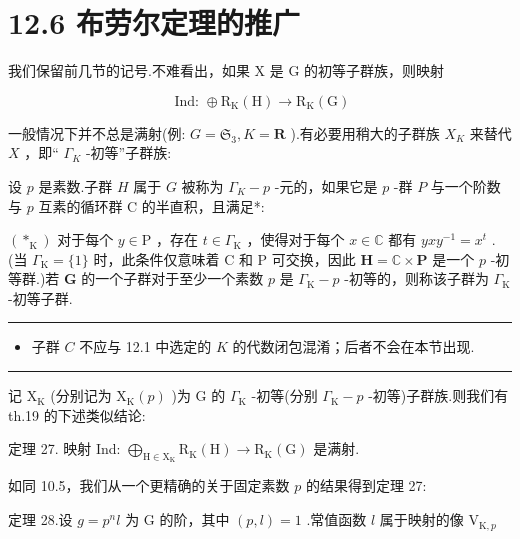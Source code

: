 \documentclass[10pt]{article}
\newcommand{\HRule}{\begin{center}\rule{0.9\linewidth}{0.2mm}\end{center}}
\begin{document}
\section*{12.6 布劳尔定理的推广}

我们保留前几节的记号.不难看出，如果 \(\mathrm{X}\) 是 \(\mathrm{G}\) 的初等子群族，则映射

\[
\text{ Ind: } \oplus  {\mathrm{R}}_{\mathrm{K}}\left( \mathrm{H}\right)  \rightarrow  {\mathrm{R}}_{\mathrm{K}}\left( \mathrm{G}\right)
\]

一般情况下并不总是满射(例: \(G = {\mathfrak{S}}_{3},K = \mathbf{R}\) ).有必要用稍大的子群族 \({X}_{K}\) 来替代 \(X\) ，即“ \({\Gamma }_{K}\) -初等”子群族:

设 \(p\) 是素数.子群 \(H\) 属于 \(G\) 被称为 \({\Gamma }_{K} - p\) -元的，如果它是 \(p\) -群 \(P\) 与一个阶数与 \(p\) 互素的循环群 C 的半直积，且满足*:

\(\left( { * }_{\mathrm{K}}\right)\) 对于每个 \(y \in  \mathrm{P}\) ，存在 \(t \in  {\Gamma }_{\mathrm{K}}\) ，使得对于每个 \(x \in  \mathbb{C}\) 都有 \({yx}{y}^{-1} = {x}^{t}\) .(当 \({\Gamma }_{\mathrm{K}} = \{ 1\}\) 时，此条件仅意味着 \(\mathrm{C}\) 和 \(\mathrm{P}\) 可交换，因此 \(\mathbf{H} = \mathbb{C} \times  \mathbf{P}\) 是一个 \(p\) -初等群.)若 \(\mathbf{G}\) 的一个子群对于至少一个素数 \(p\) 是 \({\Gamma }_{\mathrm{K}} - p\) -初等的，则称该子群为 \({\Gamma }_{\mathrm{K}}\) -初等子群.

\HRule

\begin{itemize}\relax
\item\relax 子群 \(C\) 不应与 12.1 中选定的 \(K\) 的代数闭包混淆；后者不会在本节出现.
\end{itemize}

\HRule

记 \({\mathrm{X}}_{\mathrm{K}}\) (分别记为 \({\mathrm{X}}_{\mathrm{K}}\left( p\right)\) )为 G 的 \({\Gamma }_{\mathrm{K}}\) -初等(分别 \({\Gamma }_{\mathrm{K}} - p\) -初等)子群族.则我们有 th.19 的下述类似结论:

定理 27. 映射 Ind: \({\bigoplus }_{\mathrm{H} \in  {\mathrm{X}}_{\mathrm{K}}}{\mathrm{R}}_{\mathrm{K}}\left( \mathrm{H}\right)  \rightarrow  {\mathrm{R}}_{\mathrm{K}}\left( \mathrm{G}\right)\) 是满射.

如同 10.5，我们从一个更精确的关于固定素数 \(p\) 的结果得到定理 27:

定理 28.设 \(g = {p}^{n}l\) 为 \(\mathrm{G}\) 的阶，其中 \(\left( {p,l}\right)  = 1\) .常值函数 \(l\) 属于映射的像 \({\mathrm{V}}_{\mathrm{K},p}\)
\end{document}
